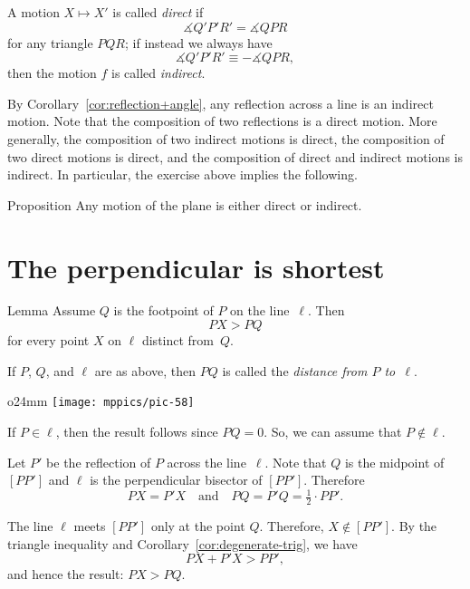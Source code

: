A motion $X\mapsto X'$ is called \emph{direct} if 
$$\measuredangle Q'P'R'= \measuredangle QPR$$ 
for any triangle $PQR$;
if instead we always have 
$$\measuredangle Q'P'R'\equiv -\measuredangle QPR,$$ 
then the motion $f$ is called \emph{indirect}.

By Corollary~\ref{cor:reflection+angle}, any reflection across a line is an indirect motion.
Note that the composition of two reflections is a direct motion.
More generally, the composition of two indirect motions is direct,
the composition of two direct motions is direct,
and the composition of direct and indirect motions is indirect.
In particular, the exercise above implies the following.

\begin{thm}{Proposition}\label{prop:direct-indirect}
Any motion of the plane is either direct or indirect.
\end{thm}


\section{The perpendicular is shortest}
\label{sec:perp<oblique}

\begin{thm}[\abs]{Lemma}\label{lem:perp<oblique}
Assume $Q$ is the footpoint of $P$ on the line~$\ell$.
Then 
$$PX>PQ$$
for every point $X$ on $\ell$ distinct from~$Q$.
\end{thm}

If $P$, $Q$, and $\ell$ are as above, 
then $PQ$ is called the \label{distance!from a point to a line}\emph{distance from $P$ to~$\ell$}. 

\begin{wrapfigure}{o}{24mm}
\centering
\texttt{[image: mppics/pic-58]}
\vskip3mm
\end{wrapfigure}

If $P\in \ell$, 
then the result follows since $PQ=0$.
So, we can assume that $P\notin \ell$.

Let $P'$ be the reflection of $P$ across the line~$\ell$.
Note that $Q$ is the midpoint of $[PP']$
and $\ell$ is the perpendicular bisector of $[PP']$.
Therefore
$$PX=P'X
\quad
\text{and}
\quad
PQ=P'Q=\tfrac12\cdot PP'.$$

The line $\ell$ meets $[PP']$ only at the point $Q$.
Therefore, $X\notin [PP']$.
By the triangle inequality and Corollary~\ref{cor:degenerate-trig}, we have 
$$PX+P'X>PP',$$
and hence the result: $PX>PQ$.
\qeds

